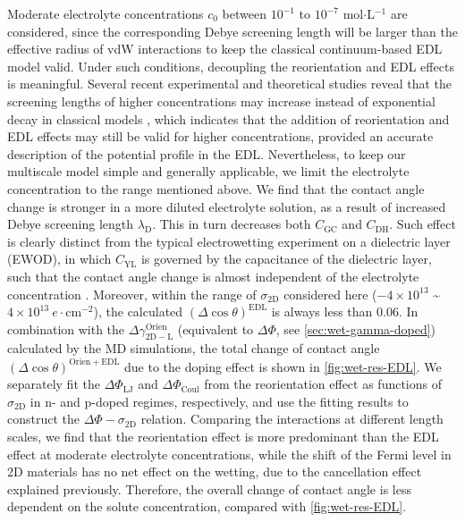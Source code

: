 Moderate electrolyte
concentrations \(c_{0}\) between \(10^{-1}\) to \(10^{-7}\)
mol\(\cdot\)L\(^{-1}\) are considered, since the corresponding Debye
screening length will be larger than the effective radius of vdW
interactions to keep the classical continuum-based EDL model valid.
Under such conditions, decoupling the reorientation and EDL effects is
meaningful.
%
Several recent experimental and theoretical studies reveal that
the screening lengths of higher concentrations may increase instead of
exponential decay in classical models
\autocite{Smith_2016_screening,Lee_2017_scaling}, which indicates that the
addition of reorientation and EDL effects may still be valid for
higher concentrations, provided an accurate description of the
potential profile in the EDL. Nevertheless, to keep our multiscale
model simple and generally applicable, we limit the electrolyte
concentration to the range mentioned above.
We find that the contact angle change is stronger in a
more diluted electrolyte solution, as a result of increased Debye
screening length \(\lambda_{\mathrm{D}}\). This in turn decreases
both \(C_{\mathrm{GC}}\) and \(C_{\mathrm{DH}}\).
%
Such effect is clearly distinct from the typical electrowetting
experiment on a dielectric layer (EWOD), in
which \(C_{\mathrm{YL}}\) is governed by the capacitance of the
dielectric layer, such that the contact angle change is almost independent of
the electrolyte concentration \autocite{Mugele_2005_EW_rev}.
%
Moreover, within the range of \(\sigma_{\mathrm{2D}}\) considered here
(\(-4\times10^{13}\) \textasciitilde{}
\(4\times10^{13}\ e\cdot \mathrm{cm}^{-2}\)), the calculated
\((\Delta \cos \theta)^{\mathrm{EDL}}\) is always less than 0.06.  In
combination with the
\(\Delta \gamma^{\mathrm{Orien}}_{\mathrm{2D-L}}\) (equivalent to
\(\Delta \Phi\), see \autoref{sec:wet-gamma-doped}) calculated by the
MD simulations, the total change of contact angle
\((\Delta \cos \theta)^{\mathrm{Orien + EDL}}\) due to the doping
effect is shown in \autoref{fig:wet-res-EDL}. We separately fit the
\(\Delta \Phi_{\mathrm{LJ}}\) and \(\Delta \Phi_{\mathrm{Coul}}\) from
the reorientation effect as functions of \(\sigma_{\mathrm{2D}}\) in
n- and p-doped regimes, respectively, and use the fitting results to
construct the \(\Delta \Phi-\sigma_{\mathrm{2D}}\) relation. Comparing
the interactions at different length scales, we find that the
reorientation effect is more predominant than the EDL effect at
moderate electrolyte concentrations, while the shift of the Fermi
level in 2D materials has no net effect on the wetting, due to the
cancellation effect explained previously. Therefore, the overall change
of contact angle is less dependent on the solute concentration,
compared with \autoref{fig:wet-res-EDL}.

